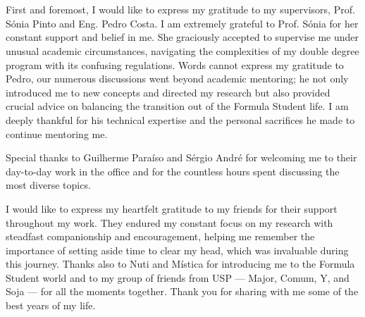 
\section*{\acknowledgments}


First and foremost, I would like to express my gratitude to my supervisors, Prof. Sónia Pinto and Eng. Pedro Costa. I am extremely grateful to Prof. Sónia for her constant support and belief in me. She graciously accepted to supervise me under unusual academic circumstances, navigating the complexities of my double degree program with its confusing regulations. Words cannot express my gratitude to Pedro, our numerous discussions went beyond academic mentoring; he not only introduced me to new concepts and directed my research but also provided crucial advice on balancing the transition out of the Formula Student life. I am deeply thankful for his technical expertise and the personal sacrifices he made to continue mentoring me.

Special thanks to Guilherme Paraíso and Sérgio André for welcoming me to their day-to-day work in the office and for the countless hours spent discussing the most diverse topics.

I would like to express my heartfelt gratitude to my friends for their support throughout my work. They endured my constant focus on my research with steadfast companionship and encouragement, helping me remember the importance of setting aside time to clear my head, which was invaluable during this journey. Thanks also to Nuti and Mística for introducing me to the Formula Student world and to my group of friends from USP — Major, Comum, Y, and Soja — for all the moments together. Thank you for sharing with me some of the best years of my life.

